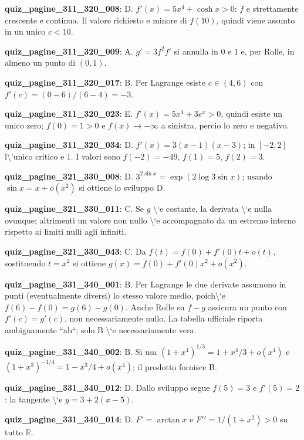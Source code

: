 \documentclass[11pt,a4paper]{article}
\newcounter{quiz}
\begin{document}
\noindent\textbf{quiz\_pagine\_311\_320\_008}: D. $f\prime(x)=5x^4+\cosh x>0$: $f$ e strettamente crescente e continua. Il valore richiesto e minore di $f(10)$, quindi viene assunto in un unico $c<10$.\par\medskip
\noindent\textbf{quiz\_pagine\_311\_320\_009}: A. $g\prime=3f^2f\prime$ si annulla in $0$ e $1$ e, per Rolle, in almeno un punto di $(0,1)$.\par\medskip
\noindent\textbf{quiz\_pagine\_311\_320\_017}: B. Per Lagrange esiste $c\in(4,6)$ con $f\prime(c)=(0-6)/(6-4)=-3$.\par\medskip
\noindent\textbf{quiz\_pagine\_311\_320\_023}: E. $f\prime(x)=5x^4+3e^x>0$, quindi esiste un unico zero; $f(0)=1>0$ e $f(x)\to-\infty$ a sinistra, percio lo zero e negativo.\par\medskip
\noindent\textbf{quiz\_pagine\_311\_320\_034}: D. $f\prime(x)=3(x-1)(x-3)$; in $[-2,2]$ l\textbackslash{}'unico critico e 1. I valori sono $f(-2)=-49$, $f(1)=5$, $f(2)=3$.\par\medskip
\noindent\textbf{quiz\_pagine\_321\_330\_008}: D. $3^{2\sin x}=\exp(2\log3\sin x)$; usando $\sin x=x+o(x^2)$ si ottiene lo sviluppo D.\par\medskip
\noindent\textbf{quiz\_pagine\_321\_330\_011}: C. Se $g$ \textbackslash{}`e costante, la derivata \textbackslash{}`e nulla ovunque; altrimenti un valore non nullo \textbackslash{}`e accompagnato da un estremo interno rispetto ai limiti nulli agli infiniti.\par\medskip
\noindent\textbf{quiz\_pagine\_321\_330\_043}: C. Da $f(t)=f(0)+f\prime(0)t+o(t)$, sostituendo $t=x^2$ si ottiene $g(x)=f(0)+f\prime(0)x^2+o(x^2)$.\par\medskip
\noindent\textbf{quiz\_pagine\_331\_340\_001}: B. Per Lagrange le due derivate assumono in punti (eventualmente diversi) lo stesso valore medio, poich\textbackslash{}`e $f(6)-f(0)=g(6)-g(0)$. Anche Rolle su $f-g$ assicura un punto con $f\prime(c)=g\prime(c)$, non necessariamente nullo. La tabella ufficiale riporta ambiguamente ``ab``; solo B \textbackslash{}`e necessariamente vera.\par\medskip
\noindent\textbf{quiz\_pagine\_331\_340\_002}: B. Si usa $(1+x^4)^{1/3}=1+x^4/3+o(x^4)$ e $(1+x^3)^{-1/4}=1-x^3/4+o(x^4)$; il prodotto fornisce B.\par\medskip
\noindent\textbf{quiz\_pagine\_331\_340\_012}: D. Dallo sviluppo segue $f(5)=3$ e $f\prime(5)=2$: la tangente \textbackslash{}`e $y=3+2(x-5)$.\par\medskip
\noindent\textbf{quiz\_pagine\_331\_340\_014}: D. $F\prime=\arctan x$ e $F\prime\prime=1/(1+x^2)>0$ su tutto $\mathbb R$.\par\medskip
\end{document}
